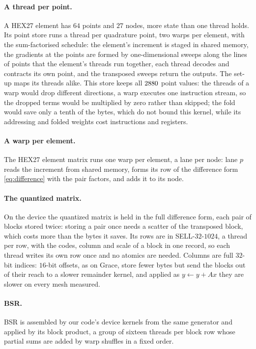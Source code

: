 \documentclass[sigconf,balance=false]{acmart}
\begin{document}
\paragraph{A thread per point.}  A HEX27 element has $64$ points and $27$ nodes, more state than one
thread holds.  Its point store runs a thread per quadrature point, two warps per element, with the
sum-factorised schedule: the element's increment is staged in shared memory, the gradients at the
points are formed by one-dimensional sweeps along the lines of points that the element's threads run
together, each thread decodes and contracts its own point, and the transposed sweeps return the
outputs.  The set-up maps its threads alike.  This store keeps all $2880$ point
values: the threads of a warp would drop different directions, a warp executes one instruction stream,
so the dropped terms would be multiplied by zero rather than skipped; the fold would save only a tenth
of the bytes, which do not bound this kernel, while its addressing and folded weights cost
instructions and registers.

\paragraph{A warp per element.}  The HEX27 element matrix runs one warp per element, a lane per node:
lane $p$ reads the increment from shared memory, forms its row of the difference form
\eqref{eq:difference} with the pair factors, and adds it to its node.

\paragraph{The quantized matrix.}  On the device the quantized matrix is held in the full difference
form, each pair of blocks stored twice: storing a pair once needs a scatter of the transposed block,
which costs more than the bytes it saves.  Its rows are in SELL-$32$-$1024$, a thread per row, with the
codes, column and scale of a block in one record, so each thread writes its own row once and no
atomics are needed.  Columns are full $32$-bit indices: $16$-bit offsets, as on Grace, store fewer bytes
but send the blocks out of their reach to a slower remainder kernel, and applied as
$y \leftarrow y + Ax$ they are slower on every mesh measured.

\paragraph{BSR.}  BSR is assembled by our code's device kernels from the same generator and applied by
its block product, a group of sixteen threads per block row whose partial sums are added by warp
shuffles in a fixed order.
\end{document}

